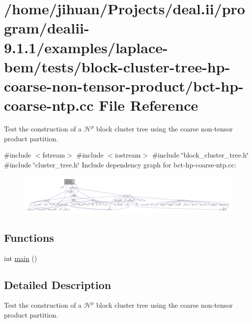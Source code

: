 \hypertarget{bct-hp-coarse-ntp_8cc}{}\section{/home/jihuan/\+Projects/deal.ii/program/dealii-\/9.1.1/examples/laplace-\/bem/tests/block-\/cluster-\/tree-\/hp-\/coarse-\/non-\/tensor-\/product/bct-\/hp-\/coarse-\/ntp.cc File Reference}
\label{bct-hp-coarse-ntp_8cc}


Test the construction of a $\mathcal{H}^p$ block cluster tree using the coarse non-\/tensor product partition.  


{\ttfamily \#include $<$fstream$>$}\newline
{\ttfamily \#include $<$iostream$>$}\newline
{\ttfamily \#include \char`\"{}block\+\_\+cluster\+\_\+tree.\+h\char`\"{}}\newline
{\ttfamily \#include \char`\"{}cluster\+\_\+tree.\+h\char`\"{}}\newline
Include dependency graph for bct-\/hp-\/coarse-\/ntp.cc\+:
\nopagebreak
\begin{figure}[H]
\begin{center}
\leavevmode
\includegraphics[width=350pt]{bct-hp-coarse-ntp_8cc__incl}
\end{center}
\end{figure}
\subsection*{Functions}
\begin{DoxyCompactItemize}
\item 
int \hyperlink{bct-hp-coarse-ntp_8cc_ae66f6b31b5ad750f1fe042a706a4e3d4}{main} ()
\end{DoxyCompactItemize}


\subsection{Detailed Description}
Test the construction of a $\mathcal{H}^p$ block cluster tree using the coarse non-\/tensor product partition. 

